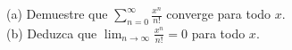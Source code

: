 \item (a) Demuestre que $\displaystyle\sum_{n=0}^\infty \frac{x^n}{n!}$ converge para todo $x$. \\
    (b) Deduzca que $\displaystyle\lim_{n \to \infty} \frac{x^n}{n!} = 0$ para todo $x$.
